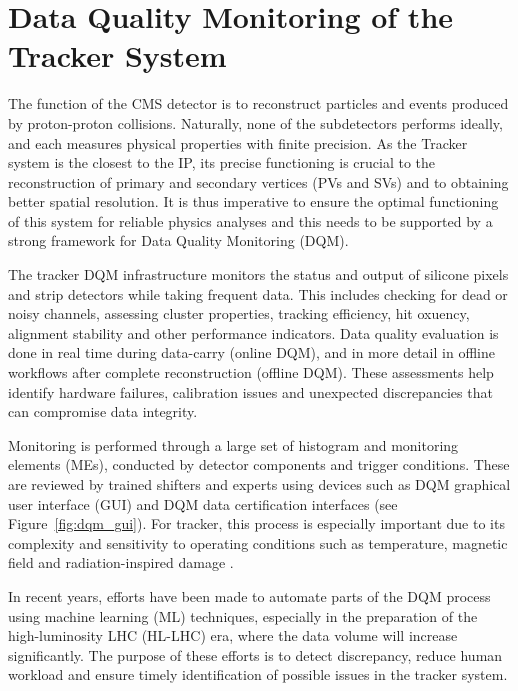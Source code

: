 \section{Data Quality Monitoring of the Tracker System}

The function of the CMS detector is to reconstruct particles and events produced by proton-proton collisions. Naturally, none of the subdetectors performs ideally, and each measures physical properties with finite precision. As the Tracker system is the closest to the IP, its precise functioning is crucial to the reconstruction of primary and secondary vertices (PVs and SVs) and to obtaining better spatial resolution. It is thus imperative to ensure the optimal functioning of this system for reliable physics analyses and this needs to be supported by a strong framework for Data Quality Monitoring (DQM).


The tracker DQM infrastructure monitors the status and output of silicone pixels and strip detectors while taking frequent data. This includes checking for dead or noisy channels, assessing cluster properties, tracking efficiency, hit oxuency, alignment stability and other performance indicators. Data quality evaluation is done in real time during data-carry (online DQM), and in more detail in offline workflows after complete reconstruction (offline DQM). These assessments help identify hardware failures, calibration issues and unexpected discrepancies that can compromise data integrity.

Monitoring is performed through a large set of histogram and monitoring elements (MEs), conducted by detector components and trigger conditions. These are reviewed by trained shifters and experts using devices such as DQM graphical user interface (GUI) and DQM data certification interfaces (see Figure~\ref{fig:dqm_gui}). For tracker, this process is especially important due to its complexity and sensitivity to operating conditions such as temperature, magnetic field and radiation-inspired damage \cite{DQM_1, DQM_2}.

In recent years, efforts have been made to automate parts of the DQM process using machine learning (ML) techniques, especially in the preparation of the high-luminosity LHC (HL-LHC) era, where the data volume will increase significantly. The purpose of these efforts is to detect discrepancy, reduce human workload and ensure timely identification of possible issues in the tracker system.

